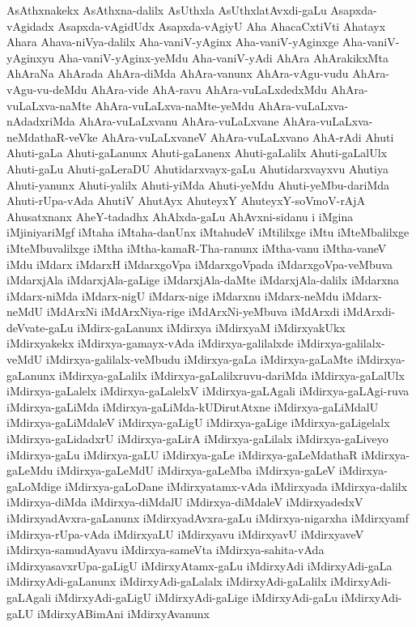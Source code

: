 {AsAthxnakekx
AsAthxna-dalilx
AsUthxla
AsUthxlatAvxdi-gaLu
Asapxda-vAgidadx
Asapxda-vAgidUdx
Asapxda-vAgiyU
Aha
AhacaCxtiVti
Ahatayx
Ahara
Ahava-niVya-dalilx
Aha-vaniV-yAginx
Aha-vaniV-yAginxge
Aha-vaniV-yAginxyu
Aha-vaniV-yAginx-yeMdu
Aha-vaniV-yAdi
AhAra
AhArakikxMta
AhAraNa
AhArada
AhAra-diMda
AhAra-vanunx
AhAra-vAgu-vudu
AhAra-vAgu-vu-deMdu
AhAra-vide
AhA-ravu
AhAra-vuLaLxdedxMdu
AhAra-vuLaLxva-naMte
AhAra-vuLaLxva-naMte-yeMdu
AhAra-vuLaLxva-nAdadxriMda
AhAra-vuLaLxvanu
AhAra-vuLaLxvane
AhAra-vuLaLxva-neMdathaR-veVke
AhAra-vuLaLxvaneV
AhAra-vuLaLxvano
AhA-rAdi
Ahuti
Ahuti-gaLa
Ahuti-gaLanunx
Ahuti-gaLanenx
Ahuti-gaLalilx
Ahuti-gaLalUlx
Ahuti-gaLu
Ahuti-gaLeraDU
Ahutidarxvayx-gaLu
Ahutidarxvayxvu
Ahutiya
Ahuti-yanunx
Ahuti-yalilx
Ahuti-yiMda
Ahuti-yeMdu
Ahuti-yeMbu-dariMda
Ahuti-rUpa-vAda
AhutiV
AhutAyx
AhuteyxY
AhuteyxY-soVmoV-rAjA
Ahusatxnanx
AheY-tadadhx
AhAlxda-gaLu
AhAvxni-sidanu
i
iMgina
iMjiniyariMgf
iMtaha
iMtaha-danUnx
iMtahudeV
iMtililxge
iMtu
iMteMbalilxge
iMteMbuvalilxge
iMtha
iMtha-kamaR-Tha-ranunx
iMtha-vanu
iMtha-vaneV
iMdu
iMdarx
iMdarxH
iMdarxgoVpa
iMdarxgoVpada
iMdarxgoVpa-veMbuva
iMdarxjAla
iMdarxjAla-gaLige
iMdarxjAla-daMte
iMdarxjAla-dalilx
iMdarxna
iMdarx-niMda
iMdarx-nigU
iMdarx-nige
iMdarxnu
iMdarx-neMdu
iMdarx-neMdU
iMdArxNi
iMdArxNiya-rige
iMdArxNi-yeMbuva
iMdArxdi
iMdArxdi-deVvate-gaLu
iMdirx-gaLanunx
iMdirxya
iMdirxyaM
iMdirxyakUkx
iMdirxyakekx
iMdirxya-gamayx-vAda
iMdirxya-galilalxde
iMdirxya-galilalx-veMdU
iMdirxya-galilalx-veMbudu
iMdirxya-gaLa
iMdirxya-gaLaMte
iMdirxya-gaLanunx
iMdirxya-gaLalilx
iMdirxya-gaLalilxruvu-dariMda
iMdirxya-gaLalUlx
iMdirxya-gaLalelx
iMdirxya-gaLalelxV
iMdirxya-gaLAgali
iMdirxya-gaLAgi-ruva
iMdirxya-gaLiMda
iMdirxya-gaLiMda-kUDirutAtxne
iMdirxya-gaLiMdalU
iMdirxya-gaLiMdaleV
iMdirxya-gaLigU
iMdirxya-gaLige
iMdirxya-gaLigelalx
iMdirxya-gaLidadxrU
iMdirxya-gaLirA
iMdirxya-gaLilalx
iMdirxya-gaLiveyo
iMdirxya-gaLu
iMdirxya-gaLU
iMdirxya-gaLe
iMdirxya-gaLeMdathaR
iMdirxya-gaLeMdu
iMdirxya-gaLeMdU
iMdirxya-gaLeMba
iMdirxya-gaLeV
iMdirxya-gaLoMdige
iMdirxya-gaLoDane
iMdirxyatamx-vAda
iMdirxyada
iMdirxya-dalilx
iMdirxya-diMda
iMdirxya-diMdalU
iMdirxya-diMdaleV
iMdirxyadedxV
iMdirxyadAvxra-gaLanunx
iMdirxyadAvxra-gaLu
iMdirxya-nigarxha
iMdirxyamf
iMdirxya-rUpa-vAda
iMdirxyaLU
iMdirxyavu
iMdirxyavU
iMdirxyaveV
iMdirxya-samudAyavu
iMdirxya-sameVta
iMdirxya-sahita-vAda
iMdirxyasavxrUpa-gaLigU
iMdirxyAtamx-gaLu
iMdirxyAdi
iMdirxyAdi-gaLa
iMdirxyAdi-gaLanunx
iMdirxyAdi-gaLalalx
iMdirxyAdi-gaLalilx
iMdirxyAdi-gaLAgali
iMdirxyAdi-gaLigU
iMdirxyAdi-gaLige
iMdirxyAdi-gaLu
iMdirxyAdi-gaLU
iMdirxyABimAni
iMdirxyAvanunx
}
